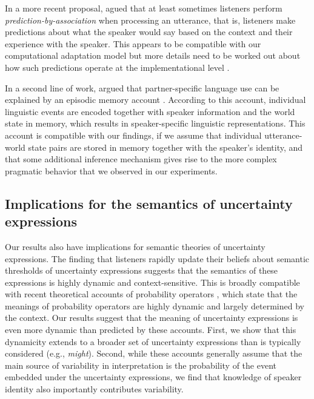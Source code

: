 \documentclass[man, floatsintext]{apa6}
\begin{document}
In a more recent proposal, \textcite{Pickering2013} agued that
at least sometimes listeners perform \textit{prediction-by-association} when processing
an utterance, that is, listeners make predictions about what the speaker would say based on
the context and their experience with the speaker.  This appears to
be compatible with our computational adaptation model but more details need to be
worked out about how such predictions operate at the implementational level \parencite{Marr1982}.

In a second line of work, \textcite{Horton2005,Horton2016} argued that partner-specific
language use can be explained by an episodic memory account \parencite{Goldinger1998,Johnson1997,Pierrehumbert2001}.
According to this account, individual linguistic events are encoded together with
speaker information and the world state in memory, which results in speaker-specific
linguistic representations. This account is compatible with our findings, if we assume
that individual utterance-world state pairs are stored in memory together with the speaker's 
identity, and that some additional inference mechanism gives rise to the more complex
pragmatic behavior that we observed in our experiments.



\subsection{Implications for the semantics of uncertainty expressions}

Our results also have implications for semantic theories of uncertainty expressions.
The finding that listeners rapidly update their beliefs about semantic thresholds of uncertainty expressions
suggests that the semantics of these expressions is highly dynamic and context-sensitive. This is broadly compatible with recent 
theoretical accounts of probability operators \parencite[a subset of uncertainty expressions; e.g.,][]{Yalcin2010,Lassiter2015,Lassiter2016}, which 
state that the meanings of probability operators are highly dynamic and largely determined by the context. Our results
suggest that the meaning of uncertainty expressions is even more dynamic than predicted by these accounts. First, we show that this dynamicity 
extends to a broader set of uncertainty expressions than is typically considered (e.g., \textit{might}). Second, while these accounts generally assume 
that the main source of variability in interpretation is the probability of the event
embedded under the uncertainty expressions, we find that knowledge of speaker identity also  importantly contributes variability.
\end{document}
